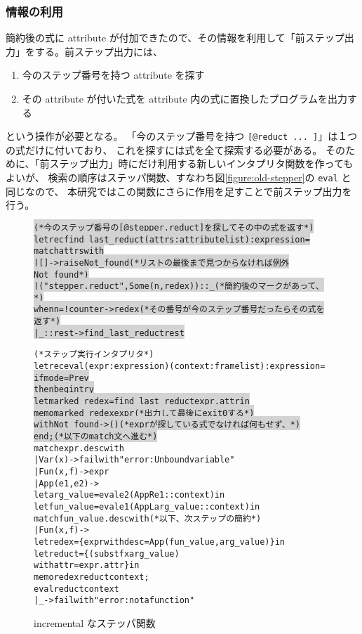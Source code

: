 \subsubsection{情報の利用}
簡約後の式に attribute が付加できたので、その情報を利用して「前ステップ出力」をする。前ステップ出力には、
\begin{enumerate}
\item 今のステップ番号を持つ attribute を探す
\item その attribute が付いた式を attribute 内の式に置換したプログラムを出力する
\end{enumerate}
という操作が必要となる。
「今のステップ番号を持つ \texttt{[@reduct ... ]}」は１つの式だけに付いており、
これを探すには式を全て探索する必要がある。
そのために、「前ステップ出力」時にだけ利用する新しいインタプリタ関数を作ってもよいが、
検索の順序はステッパ関数、すなわち図\ref{figure:old-stepper}の \texttt{eval} と同じなので、
本研究ではこの関数にさらに作用を足すことで前ステップ出力を行う。

\begin{figure}
\begin{spacing}{0.8}
\begin{alltt}
\colorbox{lightgray}{ (* 今のステップ番号の [@stepper.reduct] を探してその中の式を返す *)}
\colorbox{lightgray}{let rec find\_last\_reduct (attrs : attribute list) : expression =}
\colorbox{lightgray}{  match attrs with}
\colorbox{lightgray}{  | [] -> raise Not\_found      (* リストの最後まで見つからなければ例外 Not\_found *)}
\colorbox{lightgray}{  | ("stepper.reduct", Some (n, redex)) :: \_        (* 簡約後のマークがあって、 *)}
\colorbox{lightgray}{    when n = !counter -> redex (* その番号が今のステップ番号だったらその式を返す *)}
\colorbox{lightgray}{  | \_ :: rest -> find\_last\_reduct rest}

(* ステップ実行インタプリタ *)
let rec eval (expr : expression) (context : frame list) : expression =
\colorbox{lightgray}{  if mode = Prev}
\colorbox{lightgray}{  then begin try}
\colorbox{lightgray}{      let marked\_redex = find\_last\_reduct expr.attr in}
\colorbox{lightgray}{      memo marked\_redex expr                     (* 出力して最後に exit 0 する *)}
\colorbox{lightgray}{    with Not\_found -> ()             (* expr が探している式でなければ何もせず、 *)}
\colorbox{lightgray}{  end;                                               (* 以下の match 文へ進む *)}
  match expr.desc with
    | Var (x) -> failwith "error: Unbound variable"
    | Fun (x, f) -> expr
    | App (e1, e2) ->
      let arg\_value = eval e2 (AppR e1 :: context) in
      let fun\_value = eval e1 (AppL arg\_value :: context) in
      match fun\_value.desc with                       (* 以下、次ステップの簡約 *)
        | Fun (x, f) ->
          let redex = \{expr with desc = App (fun\_value, arg\_value)\} in
          let reduct = \{(subst f x arg\_value)
                        with attr = expr.attr\} in
          memo redex reduct context;
          eval reduct context
        | \_ -> failwith "error: not a function"
\end{alltt}
\end{spacing}
\caption{incremental なステッパ関数}
\label{figure:new-stepper}
\end{figure}

